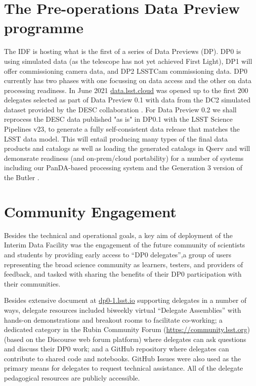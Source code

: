 \documentclass[11pt,twoside]{article}
\begin{document}
\section {The Pre-operations Data Preview programme}
The IDF is hosting what is the first of a series of Data Previews (DP). DP0 is using simulated data (as the telescope has not yet achieved First Light), DP1 will offer commissioning camera data,
and DP2 LSSTCam commissioning data. DP0 currently has two phases\citep{RTN-001} with one focussing on data access and the other on data processing readiness.
In June 2021 \href{https://data.lsst.cloud}{data.lsst.cloud} was opened up to the first 200 delegates selected as part of Data Preview 0.1 with data from the DC2 simulated dataset provided by the DESC collaboration \citep{arXiv:2010.05926}.
For Data Preview 0.2 we shall reprocess the DESC data published "as is" in DP0.1 with the LSST Science Pipelines v23, to generate a fully self-consistent data release that matches the LSST data model.
This will entail producing many types of the final data products and catalogs as well as loading the  generated catalogs in Qserv and will demonsrate readiness (and on-prem/cloud portability) for a number of systems including our PanDA-based processing system and the Generation 3 version of the Butler \citep{2019ASPC..523..653J}.

\section{Community Engagement }

Besides the technical and operational goals, a key aim of deployment of the Interim Data Facility was the engagement of the future community of scientists and students by providing early access to ``DP0 delegates'',a group of users representing the broad science community as learners, testers, and providers of feedback, and tasked with sharing the benefits of their DP0 participation with their communities.

Besides extensive document at \href{https://dp0-1.lsst.io}{dp0-1.lsst.io} supporting delegates in a number of ways, delegate resources included biweekly virtual ``Delegate Assemblies'' with hands-on demonstrations and breakout rooms to facilitate co-working; a dedicated category in the Rubin Community Forum (\url{https://community.lsst.org}) (based on the Discourse web forum platform) where delegates can ask questions and discuss their DP0 work; and a GitHub repository where delegates can contribute to shared code and notebooks.
GitHub Issues were also used as the primary means for delegates to request technical assistance. All of the delegate pedagogical resources are publicly accessible.
\end{document}
